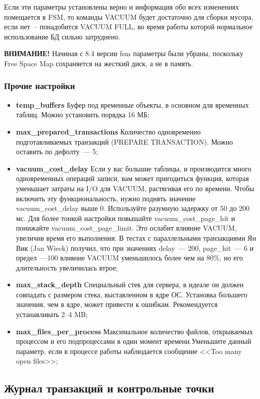Если эти параметры установлены верно и информация обо всех изменениях помещается в FSM, то команды VACUUM будет достаточно для сборки мусора, если нет~-- понадобится VACUUM FULL, во время работы которой нормальное использование БД сильно затруднено.

\textbf{ВНИМАНИЕ!} Начиная с 8.4 версии fsm параметры были убраны, поскольку Free Space Map сохраняется на жесткий диск, а не в память.

\subsubsection{Прочие настройки}

\begin{itemize}
  \item \textbf{temp\_buffers} Буфер под временные объекты, в основном для временных таблиц. Можно установить порядка 16 МБ;
  \item \textbf{max\_prepared\_transactions} Количество одновременно подготавливаемых транзакций (PREPARE TRANSACTION). Можно оставить по дефолту~--- 5;
  \item \textbf{vacuum\_cost\_delay} Если у вас большие таблицы, и производится много одновременных операций записи, вам может пригодиться функция, которая уменьшает затраты на I/O для VACUUM, растягивая его по времени. Чтобы включить эту функциональность, нужно поднять значение vacuum\_cost\_delay выше 0. Используйте разумную задержку от 50 до 200 мс. Для более тонкой настройки повышайте vacuum\_cost\_page\_hit и понижайте vacuum\_cost\_page\_limit. Это ослабит влияние VACUUM, увеличив время его выполнения. В тестах с параллельными транзакциями Ян Вик (Jan Wieck) получил, что при значениях delay~--- 200, page\_hit~--- 6 и предел~---100 влияние VACUUM уменьшилось более чем на 80\%, но его длительность увеличилась втрое;
  \item \textbf{max\_stack\_depth} Специальный стек для сервера, в идеале он должен совпадать с размером стека, выставленном в ядре ОС. Установка большего значения, чем в ядре, может привести к ошибкам. Рекомендуется устанавливать 2--4 MB;
  \item \textbf{max\_files\_per\_process} Максимальное количество файлов, открываемых процессом и его подпроцессами в один момент времени.Уменьшите данный параметр, если в процессе работы наблюдается сообщение <<Too many open files>>;
\end{itemize}


\subsection{Журнал транзакций и контрольные точки}

